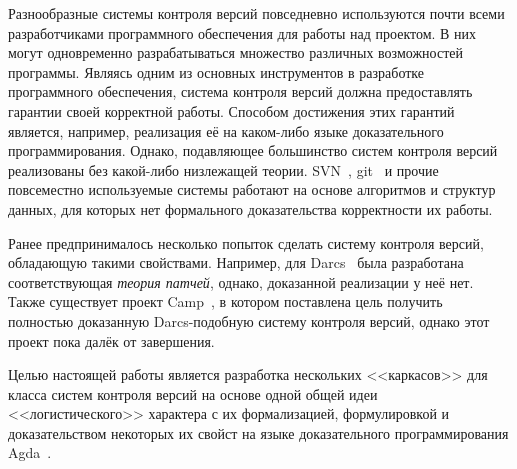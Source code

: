 \startprefacepage

Разнообразные системы контроля версий повседневно используются почти
всеми разработчиками программного обеспечения для работы над проектом.
В них могут одновременно разрабатываться множество различных
возможностей программы. Являясь одним из основных инструментов в
разработке программного обеспечения, система контроля версий должна
предоставлять гарантии своей корректной работы. Способом достижения
этих гарантий является, например, реализация её на каком-либо языке
доказательного программирования. Однако, подавляющее большинство
систем контроля версий реализованы без какой-либо низлежащей теории.
SVN~\cite{svnbook}, git~\cite{git} и прочие повсеместно используемые
системы работают на основе алгоритмов и структур данных, для которых
нет формального доказательства корректности их работы.



Ранее предпринималось несколько попыток сделать систему контроля
версий, обладающую такими свойствами. Например, для Darcs~\cite{darcs}
была разработана соответствующая \emph{теория патчей}, однако,
доказанной реализации у неё нет. Также существует проект
Camp~\cite{camp}, в котором поставлена цель получить полностью
доказанную Darcs-подобную систему контроля версий, однако этот проект
пока далёк от завершения.

Целью настоящей работы является разработка нескольких <<каркасов>> для
класса систем контроля версий на основе одной общей идеи
<<логистического>> характера с их формализацией, формулировкой и
доказательством некоторых их свойст на языке доказательного
программирования Agda~\cite{agda}.
